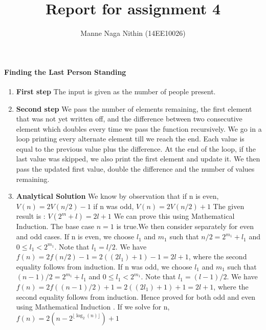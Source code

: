 \documentclass[a4paper,11pt]{article}
\title{Report for assignment 4}
\author{Manne Naga Nithin (14EE10026)}
\begin{document}
\maketitle

\paragraph{Finding the Last Person Standing}
\begin{enumerate}
 \item \textbf{First step}\newline
The input is given as the number of people present.

 \item \textbf{Second step}\newline
 We pass the number of elements remaining, the first element that was not yet written off, and the difference between two consecutive element which doubles every time we pass the function recursively. We go in a loop printing every alternate element till we reach the end. Each value is equal to the previous value plus the difference. At the end of the loop, if the last value was skipped, we also print the first element and update it. We then pass the updated first value, double the difference and the number of values remaining.

 \item \textbf{Analytical Solution}\newline
 We know by observation that\newline
 if n is even, $V(n) = 2V(n/2)-1$\newline
 if n was odd, $V(n) = 2V(n/2)+1$\newline
 The given result is :\newline
 $V(2^m+l)=2l+1$\newline
 We can prove this using Mathematical Induction. The base case $n=1$ is true.We then consider separately for even and odd cases.\newline
 If n is even,\newline
 we choose $l_1$ and $m_1$ such that $n/2 = 2^{m_1}+l_1$ and $0\leq l_1 < 2^{m_1}$.\newline
 Note that $l_1 = l/2$.\newline
 We have $f(n) = 2f(n/2)-1=2((2l_1)+1)-1 = 2l+1$, where the second equality follows from induction.\newline
 If n was odd,\newline
 we choose $l_1$ and $m_1$ such that $(n-1)/2 = 2^{m_1}+l_1$ and $0\leq l_1 < 2^{m_1}$.\newline
 Note that $l_1 = (l-1)/2$.\newline
 We have $f(n) = 2f((n-1)/2)+1=2((2l_1)+1)+1 = 2l+1$, where the second equality follows from induction.\newline
 Hence proved for both odd and even using Mathematical Induction .\newline
 If we solve for n, $f(n) = 2(n-2^{\lfloor \log_2(n) \rfloor})+1$
\end{enumerate}
\end{document}
